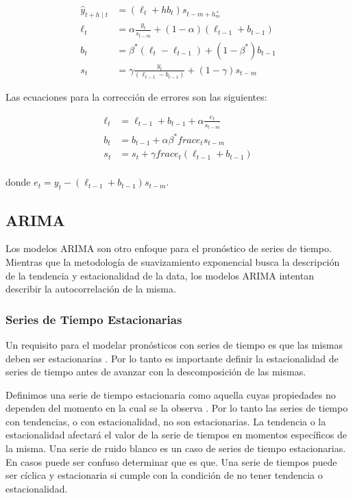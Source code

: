 \begin{equation}
\begin{split}
	\hat{y}_{t+h \mid t} & = (\ell_{t} + hb_{t}) s_{t-m+h_{m}^{+}} \\
 	\ell_{t} & = \alpha \frac{y_{t}}{s_{t-m}} + (1 - \alpha)(\ell_{t-1} + b_{t-1}) \\
    b_{t} & = \beta^{*}(\ell_{t} - \ell_{t-1}) + (1 - \beta^{*})b_{t-1} \\
    s_{t} & = \gamma \frac{y_{t}}{(\ell_{t-1} - b_{t-1})} + (1-\gamma)s_{t-m}
\end{split}
\end{equation}

Las ecuaciones para la corrección de errores son las siguientes:

\begin{equation}
\begin{split}
	\ell_{t} & = \ell_{t-1} + b_{t-1} + \alpha \frac{e_{t}}{s_{t-m}} \\
    b_{t} & = b_{t-1} + \alpha \beta^{*} frac{e_{t}}{s_{t-m}} \\
    s_{t} & = s_{t} + \gamma frac{e_{t}}{(\ell_{t-1} + b_{t-1})} \\
\end{split}
\end{equation}

donde $e_{t} = y_{t} - (\ell_{t-1} + b_{t-1})s_{t-m}$.

\subsection{ARIMA}
Los modelos ARIMA son otro enfoque para el pronóstico de series de tiempo. Mientras que la metodología de suavizamiento exponencial busca la descripción de la tendencia y estacionalidad de la data, los modelos ARIMA intentan describir la autocorrelación de la misma.

\subsubsection{Series de Tiempo Estacionarias}
Un requisito para el modelar pronósticos con series de tiempo es que las mismas deben ser estacionarias \cite{srivastava}. Por lo tanto es importante definir la estacionalidad de series de tiempo antes de avanzar con la descomposición de las mismas.

Definimos una serie de tiempo estacionaria como aquella cuyas propiedades no dependen del momento en la cual se la observa \cite{hyndman}. Por lo tanto las series de tiempo con tendencias, o con estacionalidad, no son estacionarias. La tendencia o la estacionalidad afectará el valor de la serie de tiempos en momentos específicos de la misma. Una serie de ruido blanco es un caso de series de tiempo estacionarias. En casos puede ser confuso determinar que es que. Una serie de tiempos puede ser cíclica y estacionaria si cumple con la condición de no tener tendencia o estacionalidad.

